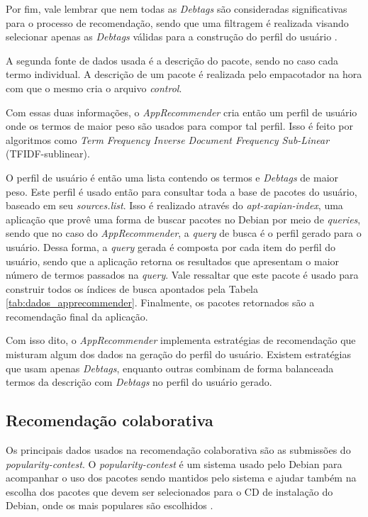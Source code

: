 Por fim, vale lembrar que nem todas as \textit{Debtags} são consideradas significativas
para o processo de recomendação, sendo que uma filtragem é realizada visando
selecionar apenas as \textit{Debtags} válidas para a construção do perfil do usuário
\cite{araujo2011apprecommender}.

A segunda fonte de dados usada é a descrição do pacote, sendo no caso cada termo
individual. A descrição de um pacote é realizada pelo empacotador na hora com
que o mesmo cria o arquivo \textit{control}.

Com essas duas informações, o \textit{AppRecommender} cria então um perfil de usuário
onde os termos de maior peso são usados para compor tal perfil. Isso é feito por
algoritmos como \textit{Term Frequency Inverse Document Frequency Sub-Linear}
(TFIDF-sublinear).

O perfil de usuário é então uma lista contendo os termos e \textit{Debtags} de maior
peso. Este perfil é usado então para consultar toda a base de pacotes
do usuário, baseado em seu \textit{sources.list}.
Isso é realizado através do \textit{apt-xapian-index}, uma aplicação
que provê uma forma de buscar pacotes no Debian por meio de \textit{queries}, sendo que no
caso do \textit{AppRecommender}, a \textit{query} de busca é o perfil gerado para o usuário. Dessa
forma, a \textit{query} gerada é composta por cada item do perfil do usuário, sendo que a
aplicação retorna os resultados que apresentam o maior número de termos passados
na \textit{query}.
Vale ressaltar que este pacote é usado para construir todos os índices de busca
apontados pela Tabela \ref{tab:dados_apprecommender}.
Finalmente, os pacotes retornados são a recomendação final da aplicação.

Com isso dito, o \textit{AppRecommender} implementa estratégias de recomendação que
misturam algum dos dados na geração do perfil do usuário. Existem estratégias
que usam apenas \textit{Debtags}, enquanto outras combinam de forma balanceada termos da
descrição com \textit{Debtags} no perfil do usuário gerado.


\subsection{Recomendação colaborativa}

Os principais dados usados na recomendação colaborativa são as submissões do
\textit{popularity-contest}. O \textit{popularity-contest} é um sistema usado pelo Debian para
acompanhar o uso dos pacotes sendo mantidos pelo sistema e ajudar também na
escolha dos pacotes que devem ser selecionados para o CD de instalação do
Debian, onde os mais populares são escolhidos \cite{araujo2011apprecommender}.

